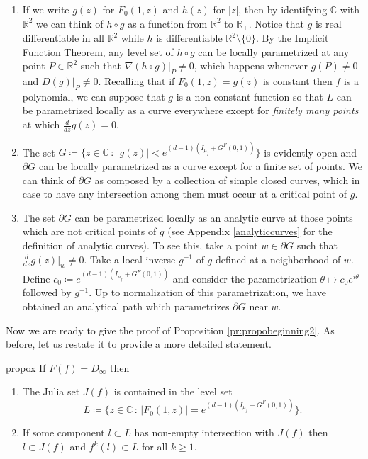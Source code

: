 \begin{enumerate}
\item If we write $g(z)$ for $F_0(1,z)$ and $h(z)$ for $|z|$, then by identifying $\mathbb{C}$ with $\mathbb{R}^2$ we can think of $h\circ g$ as a function from $\mathbb{R}^2$ to $\mathbb{R}_+$. Notice that $g$ is real differentiable in all $\mathbb{R}^2$ while $h$ is differentiable $\mathbb{R}^2\setminus \{0\}$. By the Implicit Function Theorem, any level set of $h\circ g$ can be locally parametrized at any point $P\in \mathbb{R}^2$ such that $\nabla (h\circ g)|_P \neq 0$, which happens whenever $g(P)\neq 0$ and $D(g)|_P \neq 0$. Recalling that if $F_0(1,z)=g(z)$ is constant then $f$ is a polynomial, we can suppose that $g$ is a non-constant function so that $L$ can be parametrized locally as a curve everywhere except for \emph{finitely many points} at which $\frac{d}{dz}g(z)=0$.\\

\item The set $G \coloneqq \{z\in \mathbb{C}\,:\, |g(z)|< e^{(d-1)(I_{\mu_f} + G^F(0,1))} \}$ is evidently open and $\partial G$ can be locally parametrized as a curve except for a finite set of points. We can think of $\partial G$ as composed by a collection of simple closed curves, which in case to have any intersection among them must occur at a critical point of $g$.\\

\item The set $\partial G$ can be parametrized locally as an analytic curve at those points which are not critical points of $g$ (see Appendix \ref{analyticcurves} for the definition of analytic curves). To see this, take a point $w\in \partial G$ such that $\frac{d}{dz}g(z)|_w\neq 0$. Take a local inverse $g^{-1}$ of $g$ defined at a neighborhood of $w$. Define $c_0 \coloneqq e^{(d-1)(I_{\mu_f} + G^F(0,1))}$ and consider the parametrization $\theta \mapsto c_0 e^{i\theta}$ followed by $g^{-1}$. Up to normalization of this parametrization, we have obtained an analytical path which parametrizes $\partial G$ near $w$.
\end{enumerate}

Now we are ready to give the proof of Proposition \ref{pr:propobeginning2}. As before, let us restate it to provide a more detailed statement.\\

\begin{myprop}{}{propox}
If $F(f) = D_\infty$ then 
\begin{enumerate}
\item The Julia set $J(f)$ is contained in the level set 
$$L\coloneqq \{z\in \mathbb{C}\,:\, |F_0(1,z)| = e^{(d-1)(I_{\mu_f} + G^F(0,1))}\}.$$
\item If some component $l\subset L$ has non-empty intersection with $J(f)$ then $l\subset J(f)$ and $f^{k}(l) \subset L$ for all $k\geq 1$.
\end{enumerate}
\end{myprop}

